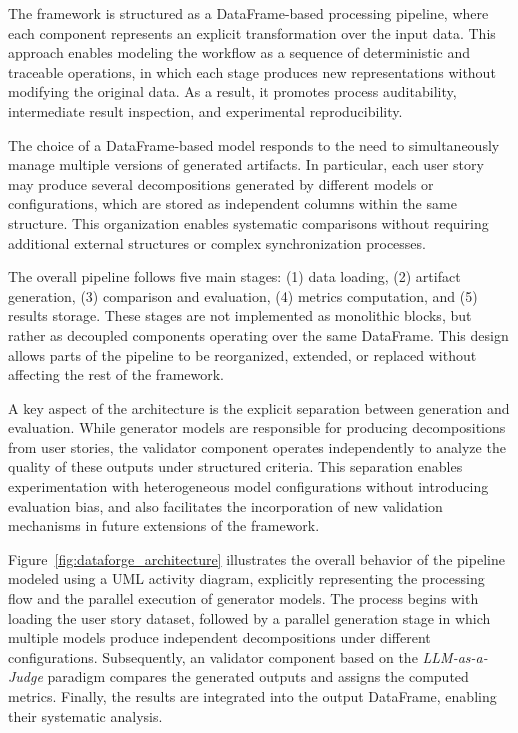 \documentclass[pdflatex,sn-mathphys-num]{sn-jnl}%
\theoremstyle{thmstyleone}%
\theoremstyle{thmstyletwo}%
\theoremstyle{thmstylethree}%
\begin{document}
The framework is structured as a DataFrame-based processing pipeline, where each component represents an explicit transformation over the input data. This approach enables modeling the workflow as a sequence of deterministic and traceable operations, in which each stage produces new representations without modifying the original data. As a result, it promotes process auditability, intermediate result inspection, and experimental reproducibility.

The choice of a DataFrame-based model responds to the need to simultaneously manage multiple versions of generated artifacts. In particular, each user story may produce several decompositions generated by different models or configurations, which are stored as independent columns within the same structure. This organization enables systematic comparisons without requiring additional external structures or complex synchronization processes.

The overall pipeline follows five main stages: (1) data loading, (2) artifact generation, (3) comparison and evaluation, (4) metrics computation, and (5) results storage. These stages are not implemented as monolithic blocks, but rather as decoupled components operating over the same DataFrame. This design allows parts of the pipeline to be reorganized, extended, or replaced without affecting the rest of the framework.

A key aspect of the architecture is the explicit separation between generation and evaluation. While generator models are responsible for producing decompositions from user stories, the validator component operates independently to analyze the quality of these outputs under structured criteria. This separation enables experimentation with heterogeneous model configurations without introducing evaluation bias, and also facilitates the incorporation of new validation mechanisms in future extensions of the framework.

Figure~\ref{fig:dataforge_architecture} illustrates the overall behavior of the pipeline modeled using a UML activity diagram, explicitly representing the processing flow and the parallel execution of generator models. The process begins with loading the user story dataset, followed by a parallel generation stage in which multiple models produce independent decompositions under different configurations. Subsequently, an validator component based on the \textit{LLM-as-a-Judge} paradigm compares the generated outputs and assigns the computed metrics. Finally, the results are integrated into the output DataFrame, enabling their systematic analysis.
\end{document}
